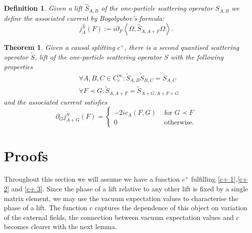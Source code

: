 \documentclass[a4paper,11pt]{article}
\newtheorem{de}{Definition}
\newtheorem{thm}{Theorem}
\begin{document}
\begin{de}
Given a lift \(\hat{S}_{A,B}\) of the one-particle scattering operator \(S_{A,B}\) we define the associated current by Bogolyubov's formula:
\begin{equation}
j_A^{\hat{S}}(F):=i\partial_F \left\langle \Omega, \hat{S}_{A,A+F} \Omega\right\rangle.
\end{equation}
\end{de}

\begin{thm}
Given a causal splitting \(c^+\), there is a second quantised scattering operator \(\tilde{S}\), lift of the one-particle scattering operator \(S\)
with the following properties
\begin{align}
&\forall A,B,C\in C_c^\infty:\tilde{S}_{A,B}\tilde{S}_{B,C}=\tilde{S}_{A,C}\\
&\forall F\prec G: \tilde{S}_{A,A+F}=\tilde{S}_{A+G,A+F+G}
\end{align}
and the associated current satisfies
\begin{equation}
\partial_G j_{A+G}^{\tilde{S}}(F)=\left\{\begin{matrix} -2i c_A(F,G)  &\text{ for } G\prec F\\ 0 &\text{  otherwise.}  \end{matrix} \right.
\end{equation}
\end{thm}

\section{Proofs}

Throughout this section we will assume we have a function \(c^+\) fulfilling \eqref{c+ 1},\eqref{c+ 2} and \eqref{c+ 3}.
Since the phase of a lift relative to any other lift is fixed by a single matrix element, we may use the vacuum expectation values to characterise the
phase of a lift. The function \(c\) captures the dependence of this object on variation of the external fields, the connection between vacuum expectation
values and \(c\) becomes clearer with the next lemma.
\end{document}
